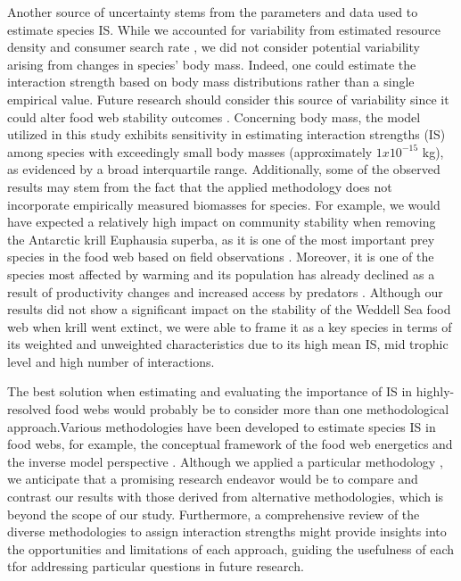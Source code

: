\documentclass[gc, manuscript]{copernicus}
\begin{document}
Another source of uncertainty stems from the parameters and data used to
estimate species IS. While we accounted for variability from estimated
resource density and consumer search rate \citep{Pawar2012}, we did not
consider potential variability arising from changes in species' body
mass. Indeed, one could estimate the interaction strength based on body
mass distributions rather than a single empirical value. Future research
should consider this source of variability since it could alter food web
stability outcomes
\citep{Brose2006a, Allesina2015, Gross2009, Landi2018}. Concerning body
mass, the model utilized in this study exhibits sensitivity in
estimating interaction strengths (IS) among species with exceedingly
small body masses (approximately \(1 x 10 ^{-15}\) kg), as evidenced by
a broad interquartile range. Additionally, some of the observed results
may stem from the fact that the applied methodology does not incorporate
empirically measured biomasses for species. For example, we would have
expected a relatively high impact on community stability when removing
the Antarctic krill Euphausia superba, as it is one of the most
important prey species in the food web based on field observations
\citep{Atkinson2019}. Moreover, it is one of the species most affected
by warming and its population has already declined as a result of
productivity changes and increased access by predators
\citep{Atkinson2004, Kawaguchi2009}. Although our results did not show a
significant impact on the stability of the Weddell Sea food web when
krill went extinct, we were able to frame it as a key species in terms
of its weighted and unweighted characteristics due to its high mean IS,
mid trophic level and high number of interactions.

The best solution when estimating and evaluating the importance of IS in
highly-resolved food webs would probably be to consider more than one
methodological approach.Various methodologies have been developed to
estimate species IS in food webs, for example, the conceptual framework
of the food web energetics \citep{Gauzens2019} and the inverse model
perspective \citep{Gellner2023}. Although we applied a particular
methodology \citep{Pawar2012}, we anticipate that a promising research
endeavor would be to compare and contrast our results with those derived
from alternative methodologies, which is beyond the scope of our study.
Furthermore, a comprehensive review of the diverse methodologies to
assign interaction strengths might provide insights into the
opportunities and limitations of each approach, guiding the usefulness
of each tfor addressing particular questions in future research.
\end{document}
